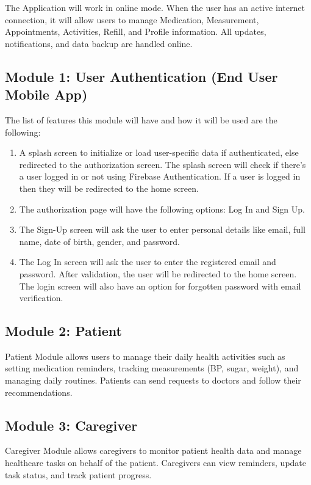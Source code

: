 The Application will work in online mode. When the user has an active internet connection, it will allow users to manage Medication, Measurement, Appointments, Activities, Refill, and Profile information. All updates, notifications, and data backup are handled online.

\subsection{Module 1: User Authentication (End User Mobile App)}
The list of features this module will have and how it will be used are the following:
\begin{enumerate}
    \item A splash screen to initialize or load user-specific data if authenticated, else redirected to the authorization screen. The splash screen will check if there's a user logged in or not using Firebase Authentication. If a user is logged in then they will be redirected to the home screen.
    \item The authorization page will have the following options: Log In and Sign Up.
    \item The Sign-Up screen will ask the user to enter personal details like email, full name, date of birth, gender, and password.
    \item The Log In screen will ask the user to enter the registered email and password. After validation, the user will be redirected to the home screen. The login screen will also have an option for forgotten password with email verification.
\end{enumerate}

\subsection{Module 2: Patient}
Patient Module allows users to manage their daily health activities such as setting medication reminders, tracking measurements (BP, sugar, weight), and managing daily routines. Patients can send requests to doctors and follow their recommendations.

\subsection{Module 3: Caregiver}
Caregiver Module allows caregivers to monitor patient health data and manage healthcare tasks on behalf of the patient. Caregivers can view reminders, update task status, and track patient progress.

